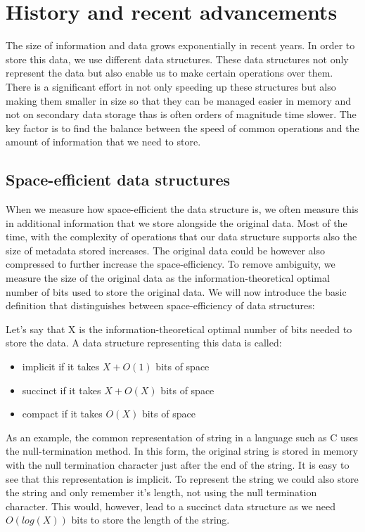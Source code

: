 \chapter{History and recent advancements}
\label{kap:kap1}

The size of information and data grows exponentially in recent years. In order to store this data, we use different data structures. These data structures not only represent the data but also enable us to make certain operations over them. There is a significant effort in not only speeding up these structures but also making them smaller in size so that they can be managed easier in memory and not on secondary data storage thas is often orders of magnitude time slower. The key factor is to find the balance between the speed of common operations and the amount of information that we need to store.

\section{Space-efficient data structures}

When we measure how space-efficient the data structure is, we often measure this in additional information that we store alongside the original data. Most of the time, with the complexity of operations that our data structure supports also the size of metadata stored increases. The original data could be however also compressed to further increase the space-efficiency. To remove ambiguity, we measure the size of the original data as the information-theoretical optimal number of bits used to store the original data. We will now introduce the basic definition that distinguishes between space-efficiency of data structures:

Let's say that X is the information-theoretical optimal number of bits needed to store the data. A data structure representing this data is called:
\begin{itemize}
\item implicit if it takes $X + O(1)$ bits of space
\item succinct if it takes $X + O(X)$ bits of space
\item compact if it takes $O(X)$ bits of space
\end{itemize}

As an example, the common representation of string in a language such as C uses the null-termination method. In this form, the original string is stored in memory with the null termination character just after the end of the string. It is easy to see that this representation is implicit. To represent the string we could also store the string and only remember it's length, not using the null termination character. This would, however, lead to a succinct data structure as we need $O(log(X))$ bits to store the length of the string.

